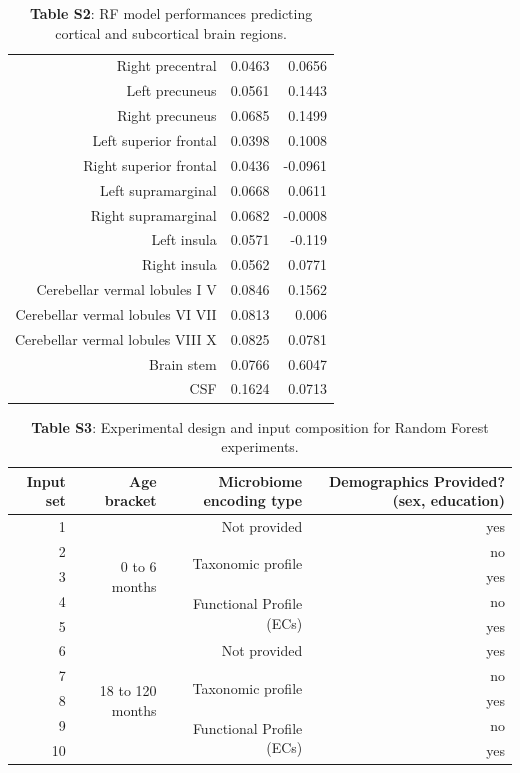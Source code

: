 \documentclass{article}
\begin{document}
\begin{table}[h]
\begin{centering}
\begin{tabular}{|r|r|r|}
      Right precentral & 0.0463 & 0.0656 \\
      Left precuneus & 0.0561 & 0.1443 \\
      Right precuneus & 0.0685 & 0.1499 \\
      Left superior frontal & 0.0398 & 0.1008 \\
      Right superior frontal & 0.0436 & -0.0961 \\
      Left supramarginal & 0.0668 & 0.0611 \\
      Right supramarginal & 0.0682 & -0.0008 \\
      Left insula & 0.0571 & -0.119 \\
      Right insula & 0.0562 & 0.0771 \\
      Cerebellar vermal lobules I V & 0.0846 & 0.1562 \\
      Cerebellar vermal lobules VI VII & 0.0813 & 0.006 \\
      Cerebellar vermal lobules VIII X & 0.0825 & 0.0781 \\
      Brain stem & 0.0766 & 0.6047 \\
      CSF & 0.1624 & 0.0713 \\\hline\hline
    \end{tabular}
    \caption*{
        \textbf{Table S2}: RF model performances predicting cortical and
        subcortical brain regions.
    }
    \end{centering}
  \end{table}


\begin{table}[h]
  \begin{centering}
    \begin{tabular}{|r|r|r|r|}
      \hline\hline
      \textbf{Input set} & \textbf{Age bracket} & \textbf{Microbiome encoding type} & \textbf{Demographics Provided? (sex, education)} \\\hline
      1 & \multirow{5}{*}{0 to 6 months} & Not provided & yes \\ \cline{3-4}
      2 &  & \multirow{2}{*}{Taxonomic profile} & no \\ \cline{4-4}
      3 &  &  & yes \\ \cline{3-4}
      4 &  & \multirow{2}{*}{Functional Profile (ECs)} & no \\ \cline{4-4}
      5 &  &  & yes \\ \cline{2-4}
      6 & \multirow{5}{*}{18 to 120 months} & Not provided & yes \\ \cline{3-4}
      7 &  & \multirow{2}{*}{Taxonomic profile} & no \\ \cline{4-4}
      8 &  &  & yes \\ \cline{3-4}
      9 &  & \multirow{2}{*}{Functional Profile (ECs)} & no \\ \cline{4-4}
      10 &  &  & yes \\\hline\hline
    \end{tabular}
    \caption*{
      \textbf{Table S3}: Experimental design and input composition for Random
      Forest experiments.
    }
  \end{centering}
\end{table}
\end{document}
